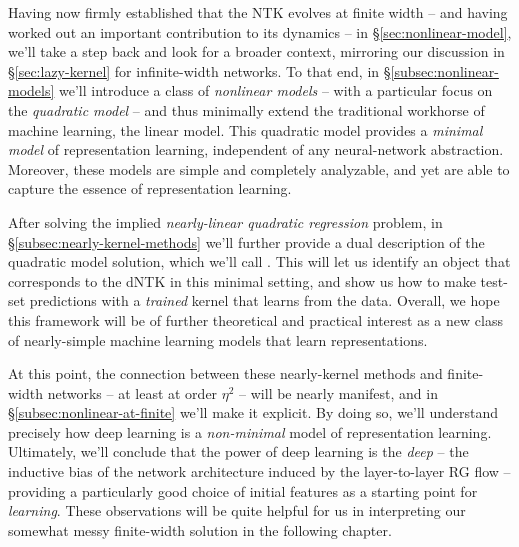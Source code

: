 Having now firmly established that the NTK evolves at finite width -- and having worked out an important contribution to its dynamics -- in  \S\ref{sec:nonlinear-model},  we'll take a step back and look for a broader context, mirroring our discussion in \S\ref{sec:lazy-kernel} for infinite-width networks.
To that end, in  \S\ref{subsec:nonlinear-models} we'll introduce a class of \emph{nonlinear models} -- with a particular focus on the \emph{quadratic model} -- and thus minimally extend the traditional workhorse of machine learning, the linear model. This quadratic model provides a \emph{minimal model} of representation learning, 
independent of any neural-network abstraction. Moreover, these models are simple and completely analyzable, and yet are able to capture the essence of representation learning.

After solving the implied \emph{nearly-linear quadratic regression} problem, in \S\ref{subsec:nearly-kernel-methods} we'll further provide a dual description of the quadratic model solution, which we'll call . This will let us identify an object that corresponds to the dNTK in this minimal setting, and show us how to make test-set predictions with a \emph{trained} kernel that learns from the data. 
Overall, we hope this framework will be of further theoretical and practical interest as a new class of nearly-simple machine learning models that learn representations.  




At this point, the connection between these nearly-kernel methods and finite-width networks -- at least at order $\eta^2$ -- will be nearly manifest, and in  \S\ref{subsec:nonlinear-at-finite} we'll make it explicit.
By doing so, we'll understand precisely how deep learning is a \emph{non-minimal} model of representation learning. Ultimately, we'll conclude that the power of deep learning is the \emph{deep} -- the inductive bias of the network architecture induced by the layer-to-layer RG flow -- providing a particularly good choice of initial features as a starting point for \emph{learning}. These observations will be quite helpful for us in interpreting our somewhat messy finite-width solution in the following chapter. 



























